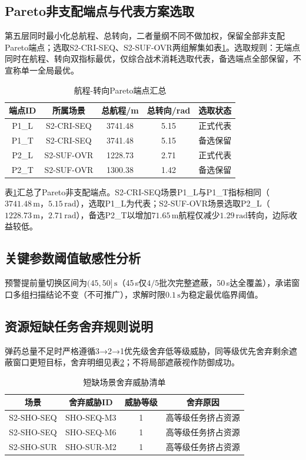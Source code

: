 \documentclass[withoutpreface,bwprint]{cumcmthesis}
\begin{document}
\subsection{Pareto非支配端点与代表方案选取}
第五层同时最小化总航程、总转向，二者量纲不同不做加权，保留全部非支配Pareto端点；选取S2-CRI-SEQ、S2-SUF-OVR两组解集如表\ref{tab:pareto}。选取规则：无端点同时在航程、转向双指标最优，仅综合战术消耗选取代表，备选端点全部保留，不宣称单一全局最优。
\begin{table}[htbp]
	\centering
	\caption{航程-转向Pareto端点汇总}
	\label{tab:pareto}
	\begin{tabular}{ccccc}
		\toprule
		端点ID & 所属场景 & 总航程/m & 总转向/rad & 选取状态 \\
		\midrule
		P1\_L & S2-CRI-SEQ & 3741.48 & 5.15 & 正式代表 \\
		P1\_T & S2-CRI-SEQ & 3741.48 & 5.15 & 备选保留 \\
		P2\_L & S2-SUF-OVR & 1228.73 & 2.71 & 正式代表 \\
		P2\_T & S2-SUF-OVR & 1300.38 & 1.42 & 备选保留 \\
		\bottomrule
	\end{tabular}
\end{table}

表\ref{tab:pareto}汇总了Pareto非支配端点。S2-CRI-SEQ场景P1\_L与P1\_T指标相同（$3741.48\,\text{m}$，$5.15\,\text{rad}$），选取P1\_L为代表；S2-SUF-OVR场景选取P2\_L（$1228.73\,\text{m}$，$2.71\,\text{rad}$），备选P2\_T以增加$71.65\,\text{m}$航程仅减少$1.29\,\text{rad}$转向，边际收益较低。

\subsection{关键参数阈值敏感性分析}
预警提前量切换区间为$(45,50]\,\text{s}$（45\,s仅$4/5$批次完整遮蔽，50\,s达全覆盖），承诺窗口多组扫描结论不变（不可推广），求解时限$0.1\,\text{s}$为稳定最优临界阈值。

\subsection{资源短缺任务舍弃规则说明}
弹药总量不足时严格遵循3→2→1优先级舍弃低等级威胁，同等级优先舍弃剩余遮蔽窗口更短目标，舍弃明细见表\ref{tab:rejected}；不将局部遮蔽视作防御成功。

\begin{table}[htbp]
	\centering
	\caption{短缺场景舍弃威胁清单}
	\label{tab:rejected}
	\begin{tabular}{cccc}
		\toprule
		场景 & 舍弃威胁ID & 威胁等级 & 舍弃原因 \\
		\midrule
		S2-SHO-SEQ & SHO-SEQ-M3 & 1 & 高等级任务挤占资源 \\
		S2-SHO-SEQ & SHO-SEQ-M6 & 1 & 高等级任务挤占资源 \\
		S2-SHO-SUR & SHO-SUR-M2 & 1 & 高等级任务挤占资源 \\
		\bottomrule
	\end{tabular}
\end{table}
\end{document}
